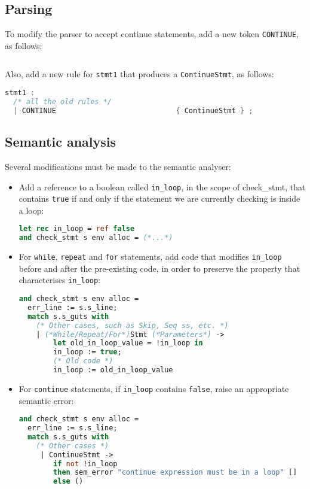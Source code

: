 \documentclass[a4paper,9pt]{article}
\begin{document}
\subsection{Parsing}

To modify the parser to accept continue statements, add a new token \texttt{CONTINUE}, as follows:

\begin{lstlisting}[language=c]
%token                  CONTINUE
\end{lstlisting}

Also, add a new rule for \texttt{stmt1} that produces a \texttt{ContinueStmt}, as follows:

\begin{lstlisting}[language=c]
stmt1 :
  /* all the old rules */
  | CONTINUE                            { ContinueStmt } ;
\end{lstlisting}

\subsection{Semantic analysis}
Several modifications must be made to the semantic analyser:
\begin{itemize}
    \item Add a reference to a boolean called \texttt{in\_loop}, in the scope of check\_stmt, that contains \texttt{true} if and only if the statement we are currently checking is inside a loop:
\begin{lstlisting}[language=ml]
let rec in_loop = ref false
and check_stmt s env alloc = (*...*)
\end{lstlisting}

\item For \texttt{while}, \texttt{repeat} and \texttt{for} statements, add code that modifies \texttt{in\_loop} before and after the pre-existing code, in order to preserve the property that characterises \texttt{in\_loop}:
\begin{lstlisting}[language=ml]
and check_stmt s env alloc =
  err_line := s.s_line;
  match s.s_guts with
    (* Other cases, such as Skip, Seq ss, etc. *)
    | (*While/Repeat/For*)Stmt (*Parameters*) ->
        let old_in_loop_value = !in_loop in
        in_loop := true;
        (* Old code *)
        in_loop := old_in_loop_value
\end{lstlisting}
\item For \texttt{continue} statements, if \texttt{in\_loop} contains \texttt{false}, raise an appropriate semantic error:
\begin{lstlisting}[language=ml]
and check_stmt s env alloc =
  err_line := s.s_line;
  match s.s_guts with
    (* Other cases *)
     | ContinueStmt ->
        if not !in_loop
        then sem_error "continue expression must be in a loop" []
        else ()
\end{lstlisting}
\end{itemize}
\end{document}
